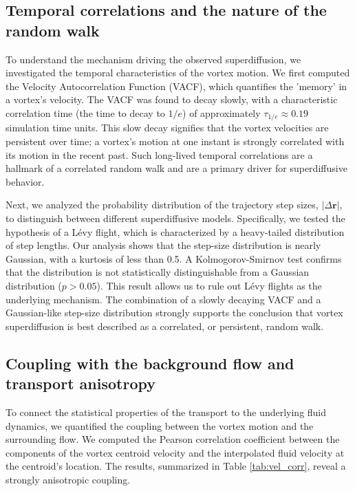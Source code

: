 \documentclass[]{article}
\begin{document}
\subsection{Temporal correlations and the nature of the random walk}
To understand the mechanism driving the observed superdiffusion, we investigated the temporal characteristics of the vortex motion. We first computed the Velocity Autocorrelation Function (VACF), which quantifies the 'memory' in a vortex's velocity. The VACF was found to decay slowly, with a characteristic correlation time (the time to decay to $1/e$) of approximately $\tau_{1/e} \approx 0.19$ simulation time units. This slow decay signifies that the vortex velocities are persistent over time; a vortex's motion at one instant is strongly correlated with its motion in the recent past. Such long-lived temporal correlations are a hallmark of a correlated random walk and are a primary driver for superdiffusive behavior.

Next, we analyzed the probability distribution of the trajectory step sizes, $|\Delta \mathbf{r}|$, to distinguish between different superdiffusive models. Specifically, we tested the hypothesis of a Lévy flight, which is characterized by a heavy-tailed distribution of step lengths. Our analysis shows that the step-size distribution is nearly Gaussian, with a kurtosis of less than 0.5. A Kolmogorov-Smirnov test confirms that the distribution is not statistically distinguishable from a Gaussian distribution ($p > 0.05$). This result allows us to rule out Lévy flights as the underlying mechanism. The combination of a slowly decaying VACF and a Gaussian-like step-size distribution strongly supports the conclusion that vortex superdiffusion is best described as a correlated, or persistent, random walk.

\subsection{Coupling with the background flow and transport anisotropy}
To connect the statistical properties of the transport to the underlying fluid dynamics, we quantified the coupling between the vortex motion and the surrounding flow. We computed the Pearson correlation coefficient between the components of the vortex centroid velocity and the interpolated fluid velocity at the centroid's location. The results, summarized in Table \ref{tab:vel_corr}, reveal a strongly anisotropic coupling.
\end{document}
